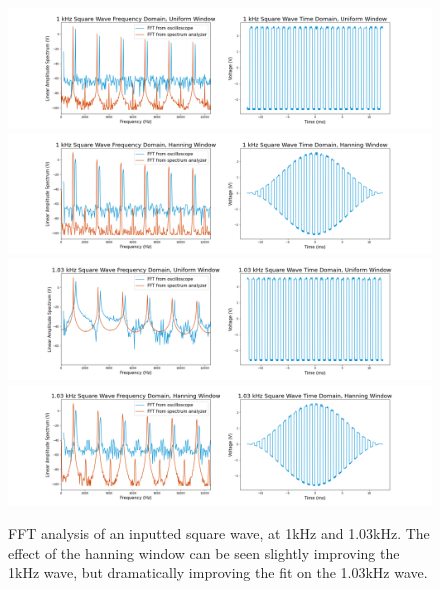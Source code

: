 \documentclass[12pt]{article}
\begin{document}
\begin{figure}[!ht]
    \centering
    \includegraphics[width=\textwidth]{1 kHz Square Wave (uniform)}
    \includegraphics[width=\textwidth]{1 kHz Square Wave (hanning)}
    \includegraphics[width=\textwidth]{1_03 kHz Square Wave (uniform)}
    \includegraphics[width=\textwidth]{1_03 kHz Square Wave (hanning)}
	\caption{FFT analysis of an inputted square wave, at 1kHz and 1.03kHz. The effect of the hanning window can be seen slightly improving the 1kHz wave, but dramatically improving the fit on the 1.03kHz wave.}
    \label{fig:square}
\end{figure} %
\end{document}
